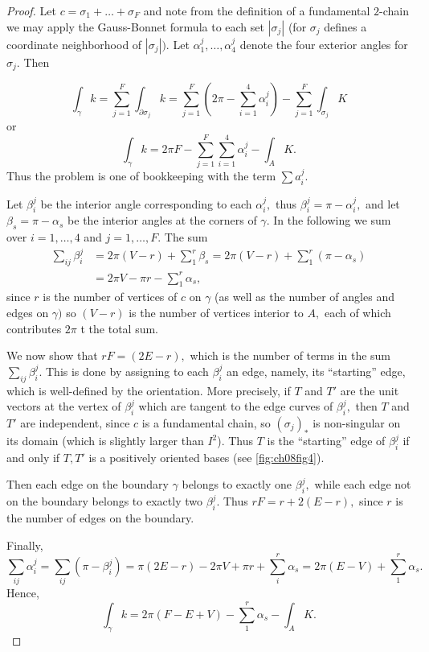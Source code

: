 \documentclass[../main]{subfiles}
\begin{document}
\begin{proof}
Let $c=\sigma_1+\ldots+\sigma_F$ and note from the definition of a fundamental $2$-chain we may apply the Gauss-Bonnet formula to each set $|\sigma_j|$ (for $\sigma_j$ defines a coordinate neighborhood of $|\sigma_j|).$ Let $\alpha_1^j,\ldots,\alpha_4^j$ denote the four exterior angles for $\sigma_j.$ Then

\[\int_{\gamma}k=\sum_{j=1}^F \int_{\partial \sigma_j}k=\sum_{j=1}^F (2\pi-\sum_{i=1}^4 \alpha_i^j)-\sum_{j=1}^F\int_{\sigma_j}K\] or \[\int_{\gamma}k=2\pi F-\sum_{j=1}^F \sum_{i=1}^4 \alpha_i^j - \int_{A}K.\] Thus the problem is one of bookkeeping with the term $\sum a_i^j.$ 

Let $\beta_i^j$ be the interior angle corresponding to each $\alpha_i^j,$ thus $\beta_i^j=\pi-\alpha_i^j,$ and let $\beta_s=\pi-\alpha_s$ be the interior angles at the corners of $\gamma.$ In the following we sum over $i=1,\ldots,4$ and $j=1,\ldots,F.$ The sum \begin{align*}
\sum_{ij}\beta_i^j&=2\pi(V-r)+\sum_1^r \beta_s=2\pi(V-r)+\sum_1^r(\pi-\alpha_s)\\
&= 2\pi V-\pi r-\sum_{1}^r\alpha_s,
\end{align*} since $r$ is the number of vertices of $c$ on $\gamma$ (as well as the number of angles and edges on $\gamma)$ so $(V-r)$ is the number of vertices interior to $A,$ each of which contributes $2\pi$ t the total sum.

We now show that $rF=(2E-r),$ which is the number of terms in the sum $\sum_{ij}\beta_{i}^j.$ This is done by assigning to each $\beta_i^j$ an edge, namely, its ``starting'' edge, which is well-defined by the orientation. More precisely, if $T$ and $T'$ are the unit vectors at the vertex of $\beta_i^j$ which are tangent to the edge curves of $\beta_i^j,$ then $T$ and $T'$ are independent, since $c$ is a fundamental chain, so $(\sigma_j)_*$ is non-singular on its domain (which is slightly larger than $I^2$). Thus $T$ is the ``starting'' edge of $\beta_i^j$ if and only if $T, T'$ is a positively oriented bases (see \ref{fig:ch08fig4}).

Then each edge on the boundary $\gamma$ belongs to exactly one $\beta_i^j,$ while each edge not on the boundary belongs to exactly two $\beta_i^j.$ Thus $rF=r+2(E-r),$ since $r$ is the number of edges on the boundary. 

Finally, \[\sum_{ij}\alpha_i^j=\sum_{ij}(\pi-\beta_i^j)=\pi(2E-r)-2\pi V+\pi r+\sum_{i}^r\alpha_s=2\pi(E-V)+\sum_{1}^r \alpha_s.\] Hence, \[\int_{\gamma}k=2\pi(F-E+V)-\sum_1^r\alpha_s-\int_{A}K.\]
\end{proof}
\end{document}
